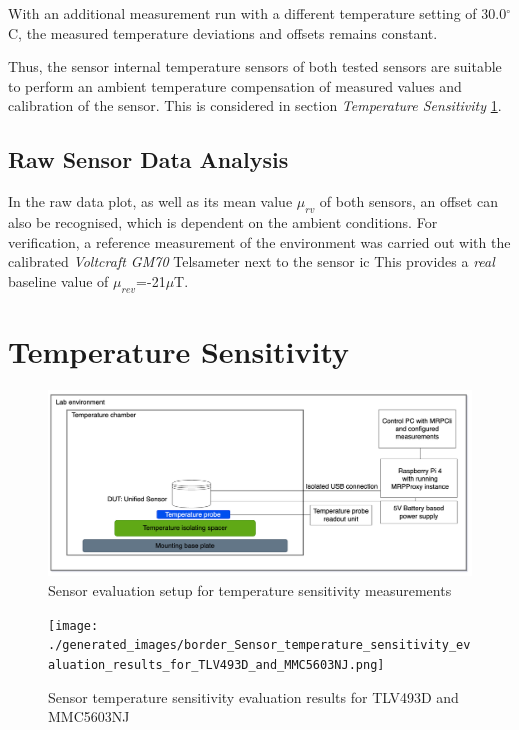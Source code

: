 With an additional measurement run with a different temperature setting
of 30.0\(^{\circ}\)C, the measured temperature deviations and offsets
remains constant.

Thus, the sensor internal temperature sensors of both tested sensors are
suitable to perform an ambient temperature compensation of measured
values and calibration of the sensor. This is considered in section
\emph{Temperature Sensitivity} \ref{temperature-sensitivity}.

\hypertarget{raw-sensor-data-analysis}{%
\subsection{Raw Sensor Data Analysis}\label{raw-sensor-data-analysis}}

In the raw data plot, as well as its mean value \(\mu_{rv}\) of both
sensors, an offset can also be recognised, which is dependent on the
ambient conditions. For verification, a reference measurement of the
environment was carried out with the calibrated \emph{Voltcraft GM70}
Telsameter next to the sensor \gls{ic} This provides a \emph{real}
baseline value of \(\mu_{rev}\)=-21\(\mu\)T.

\hypertarget{temperature-sensitivity}{%
\section{Temperature Sensitivity}\label{temperature-sensitivity}}

\begin{figure}
\centering
\includegraphics{./generated_images/border_Sensor_evaluation_setup_for_temperature_sensitivity_measurements.png}
\caption{Sensor evaluation setup for temperature sensitivity
measurements
\label{Sensor_evaluation_setup_for_temperature_sensitivity_measurements.png}}
\end{figure}

\begin{figure}
\centering
\texttt{[image: ./generated\_images/border\_Sensor\_temperature\_sensitivity\_evaluation\_results\_for\_TLV493D\_and\_MMC5603NJ.png]}
\caption{Sensor temperature sensitivity evaluation results for TLV493D
and MMC5603NJ
\label{Sensor_temperature_sensitivity_evaluation_results_for_TLV493D_and_MMC5603NJ.png}}
\end{figure}

